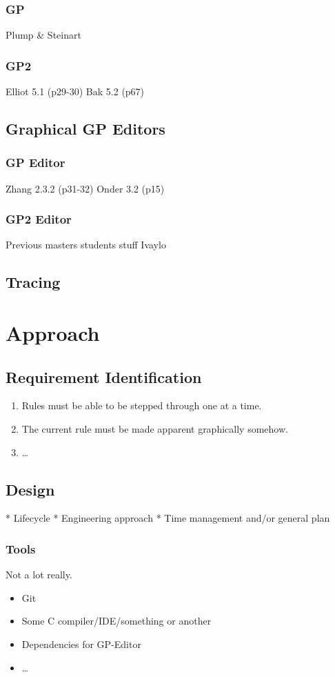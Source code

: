 \documentclass{UoYCSproject}
\begin{document}
\subsection{GP}
Plump \& Steinart
\subsection{GP2}
Elliot 5.1 (p29-30)
Bak 5.2 (p67)
\section{Graphical GP Editors}

\subsection{GP Editor}
Zhang 2.3.2 (p31-32)
Onder 3.2 (p15)
\subsection{GP2 Editor}
Previous masters students stuff
Ivaylo
\section{Tracing}

\chapter{Approach}
\section{Requirement Identification}
\begin{enumerate}
	\item Rules must be able to be stepped through one at a time.
 	\item The current rule must be made apparent graphically somehow.
	\item \ldots
\end{enumerate}
\section{Design}
 * Lifecycle
 * Engineering approach
 * Time management and/or general plan
 
\subsection{Tools}
Not a lot really.
\begin{itemize}
  \item Git
  \item Some C compiler/IDE/something or another
  \item Dependencies for GP-Editor
  \item \ldots
\end{itemize}
\end{document}
